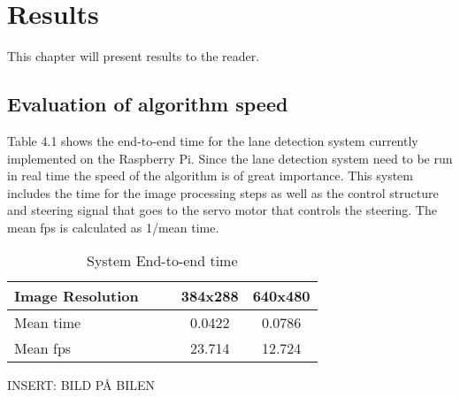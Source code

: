 \chapter{Results}
\label{sec:results}

This chapter will present results to the reader.


\section{Evaluation of algorithm speed}
Table 4.1 shows the end-to-end time for the lane detection system currently implemented on the Raspberry Pi. Since the lane detection system need to be run in real time the speed of the algorithm is of great importance. This system includes the time for the image processing steps as well as the control structure and steering signal that goes to the servo motor that controls the steering. The mean fps is calculated as 1/mean time.


\begin{table}[H]
\centering
\caption{System End-to-end time}
\label{End-to-end time}
\begin{tabular}{@{} l *4c @{}}
\toprule
Image Resolution   & & & 384x288 & 640x480  \\ 
\midrule
 Mean time & & & 0.0422 & 0.0786 \\ 
 Mean fps & & & 23.714 & 12.724 \\
\bottomrule
 \end{tabular}
\end{table}


INSERT: BILD PÅ BILEN